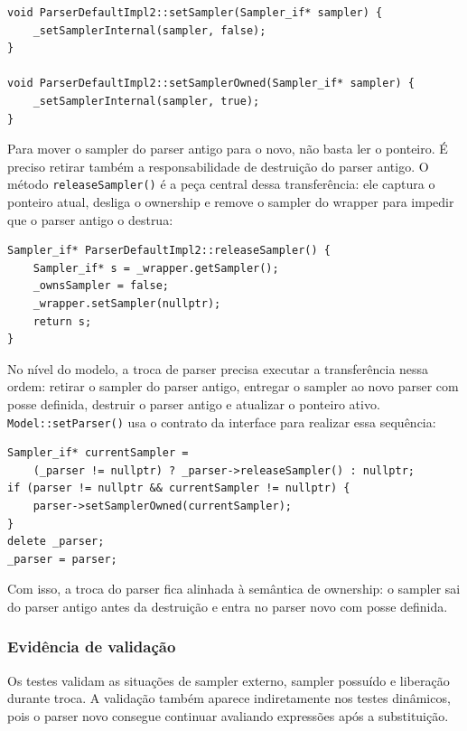 \documentclass[12pt,a4paper]{article}
\newcommand{\codeid}[1]{\texttt{\seqsplit{#1}}}
\begin{document}
\begin{lstlisting}[style=cppsmall]
void ParserDefaultImpl2::setSampler(Sampler_if* sampler) {
    _setSamplerInternal(sampler, false);
}

void ParserDefaultImpl2::setSamplerOwned(Sampler_if* sampler) {
    _setSamplerInternal(sampler, true);
}
\end{lstlisting}

Para mover o sampler do parser antigo para o novo, n\~ao basta ler o ponteiro. \'E preciso retirar tamb\'em a responsabilidade de destrui\c{c}\~ao do parser antigo. O m\'etodo \texttt{releaseSampler()} \'e a pe\c{c}a central dessa transfer\^encia: ele captura o ponteiro atual, desliga o ownership e remove o sampler do wrapper para impedir que o parser antigo o destrua:

\begin{lstlisting}[style=cppsmall]
Sampler_if* ParserDefaultImpl2::releaseSampler() {
    Sampler_if* s = _wrapper.getSampler();
    _ownsSampler = false;
    _wrapper.setSampler(nullptr);
    return s;
}
\end{lstlisting}

No n\'ivel do modelo, a troca de parser precisa executar a transfer\^encia nessa ordem: retirar o sampler do parser antigo, entregar o sampler ao novo parser com posse definida, destruir o parser antigo e atualizar o ponteiro ativo. \texttt{Model::setParser()} usa o contrato da interface para realizar essa sequ\^encia:

\begin{lstlisting}[style=cppsmall]
Sampler_if* currentSampler =
    (_parser != nullptr) ? _parser->releaseSampler() : nullptr;
if (parser != nullptr && currentSampler != nullptr) {
    parser->setSamplerOwned(currentSampler);
}
delete _parser;
_parser = parser;
\end{lstlisting}

Com isso, a troca do parser fica alinhada \`a sem\^antica de ownership: o sampler sai do parser antigo antes da destrui\c{c}\~ao e entra no parser novo com posse definida.

\subsubsection{Evid\^encia de valida\c{c}\~ao}

Os testes \codeid{ParserDefaultImpl2SetSampler*} validam as situa\c{c}\~oes de sampler externo, sampler possu\'ido e libera\c{c}\~ao durante troca. A valida\c{c}\~ao tamb\'em aparece indiretamente nos testes din\^amicos, pois o parser novo consegue continuar avaliando express\~oes ap\'os a substitui\c{c}\~ao.
\end{document}
